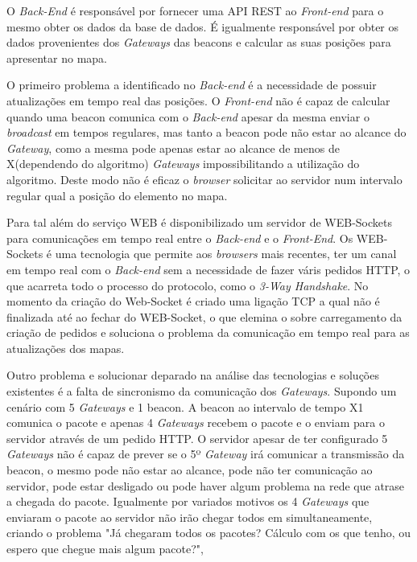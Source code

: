 \par O \textit{Back-End} é responsável por fornecer uma API REST ao \textit{Front-end} para o mesmo obter os dados da base de dados. É igualmente responsável por obter os dados provenientes dos \textit{Gateways} das beacons e calcular as suas posições para apresentar no mapa. 
\par O primeiro problema a identificado no \textit{Back-end} é a necessidade de possuir atualizações em tempo real das posições. O \textit{Front-end} não é capaz de calcular quando uma beacon comunica com o \textit{Back-end} apesar da mesma enviar o \textit{broadcast} em tempos regulares, mas tanto a beacon pode não estar ao alcance do \textit{Gateway}, como a mesma pode apenas estar ao alcance de menos de X(dependendo do algoritmo) \textit{Gateways} impossibilitando a utilização do algoritmo. Deste modo não é eficaz o \textit{browser} solicitar ao servidor num intervalo regular qual a posição do elemento no mapa.
\par Para tal além do serviço WEB é disponibilizado um servidor de WEB-Sockets para comunicações em tempo real entre o \textit{Back-end} e o \textit{Front-End}. Os WEB-Sockets é uma tecnologia que permite aos \textit{browsers} mais recentes, ter um canal em tempo real com o \textit{Back-end} sem a necessidade de fazer váris pedidos HTTP, o que acarreta todo o processo do protocolo, como o \textit{3-Way Handshake}. No momento da criação do Web-Socket é criado uma ligação TCP a qual não é finalizada até ao fechar do WEB-Socket, o que elemina o sobre carregamento da criação de pedidos e soluciona o problema da comunicação em tempo real para as atualizações dos mapas.
\par Outro problema e solucionar deparado na análise das tecnologias e soluções existentes é a falta de sincronismo da comunicação dos \textit{Gateways}. Supondo um cenário com 5 \textit{Gateways} e 1 beacon. A beacon ao intervalo de tempo X1 comunica o pacote e apenas 4 \textit{Gateways} recebem o pacote e o enviam para o servidor através de um pedido HTTP. O servidor apesar de ter configurado 5 \textit{Gateways} não é capaz de prever se o 5º \textit{Gateway} irá comunicar a transmissão da beacon, o mesmo pode não estar ao alcance, pode não ter comunicação ao servidor, pode estar desligado ou pode haver algum problema na rede que atrase a chegada do pacote. Igualmente por variados motivos os 4 \textit{Gateways} que enviaram o pacote ao servidor não irão chegar todos em simultaneamente, criando o problema "Já chegaram todos os pacotes? Cálculo com os que tenho, ou espero que chegue mais algum pacote?",
